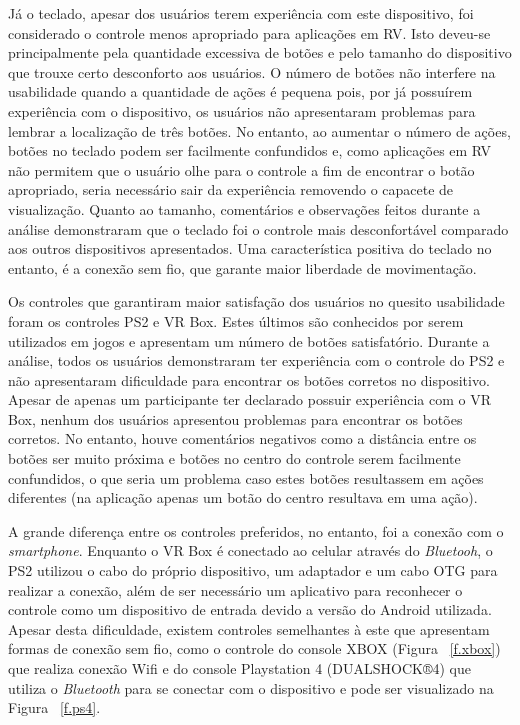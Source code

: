Já o teclado, apesar dos usuários terem experiência com este dispositivo, foi considerado o controle menos apropriado para aplicações em RV. Isto deveu-se principalmente pela quantidade excessiva de botões e pelo tamanho do dispositivo que trouxe certo desconforto aos usuários. O número de botões não interfere na usabilidade quando a quantidade de ações é pequena pois, por já possuírem experiência com o dispositivo, os usuários não apresentaram problemas para lembrar a localização de três botões. No entanto, ao aumentar o número de ações, botões no teclado podem ser facilmente confundidos e, como aplicações em RV não permitem que o usuário olhe para o controle a fim de encontrar o botão apropriado, seria necessário sair da experiência removendo o capacete de visualização. Quanto ao tamanho, comentários e observações feitos durante a análise demonstraram que o teclado foi o controle mais desconfortável comparado aos outros dispositivos apresentados. Uma característica positiva do teclado no entanto, é a conexão sem fio, que garante maior liberdade de movimentação. 

Os controles que garantiram maior satisfação dos usuários no quesito usabilidade foram os controles PS2 e VR Box. Estes últimos são conhecidos por serem utilizados em jogos e apresentam um número de botões satisfatório. Durante a análise, todos os usuários demonstraram ter experiência com o controle do PS2 e não apresentaram dificuldade para encontrar os botões corretos no dispositivo. Apesar de apenas um participante ter declarado possuir experiência com o VR Box, nenhum dos usuários apresentou problemas para encontrar os botões corretos. No entanto, houve comentários negativos como a distância entre os botões ser muito próxima e botões no centro do controle serem facilmente confundidos, o que seria um problema caso estes botões resultassem em ações diferentes (na aplicação apenas um botão do centro resultava em uma ação).

A grande diferença entre os controles preferidos, no entanto, foi a conexão com o \textit{smartphone}. Enquanto o VR Box é conectado ao celular através do \textit{Bluetooh}, o PS2 utilizou o cabo do próprio dispositivo, um adaptador e um cabo OTG para realizar a conexão, além de ser necessário um aplicativo para reconhecer o controle como um dispositivo de entrada devido a versão do Android utilizada. Apesar desta dificuldade, existem controles semelhantes à este que apresentam formas de conexão sem fio, como o controle do console XBOX (Figura ~\ref{f.xbox}) que realiza conexão Wifi e do console Playstation 4 (DUALSHOCK®4) que utiliza o \textit{Bluetooth} para se conectar com o dispositivo e pode ser visualizado na Figura ~\ref{f.ps4}.

